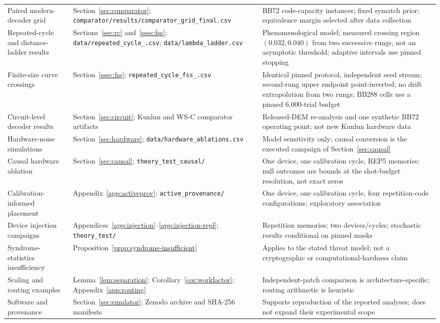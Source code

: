 \documentclass[pdflatex,sn-mathphys-num]{sn-jnl}
\theoremstyle{thmstyleone}
\theoremstyle{thmstyletwo}
\theoremstyle{thmstylethree}
\begin{document}
\begin{longtable}{@{}>{\raggedright\arraybackslash}p{3.4cm}>{\raggedright\arraybackslash}p{4.0cm}>{\raggedright\arraybackslash}p{4.3cm}@{}}
Paired modern-decoder grid & Section~\ref{sec:comparator}; \texttt{comparator/\allowbreak results/\allowbreak comparator\_\allowbreak grid\_\allowbreak final.csv} & BB72 code-capacity instances; fixed symatch prior; equivalence margin selected after data collection \\
Repeated-cycle and distance-ladder results & Sections~\ref{sec:rc} and~\ref{ssec:fss}; \texttt{data/\allowbreak repeated\_\allowbreak cycle\_\allowbreak *.csv}; \texttt{data/\allowbreak lambda\_\allowbreak ladder.csv} & Phenomenological model; measured crossing region $(0.032,0.040)$ from two successive rungs, not an asymptotic threshold; adaptive intervals use pinned stopping \\
Finite-size curve crossings & Section~\ref{ssec:fss}; \texttt{repeated\_\allowbreak cycle\_\allowbreak fss\_\allowbreak *.csv} & Identical pinned protocol, independent seed stream; second-rung upper endpoint point-inverted; no drift extrapolation from two rungs; BB288 cells use a pinned 6{,}000-trial budget \\
Circuit-level decoder results & Section~\ref{sec:circuit}; Kunlun and WS-C comparator artifacts & Released-DEM re-analysis and one synthetic BB72 operating point; not new Kunlun hardware data \\
Hardware-noise simulations & Section~\ref{sec:hardware}; \texttt{data/\allowbreak hardware\_\allowbreak ablations.csv} & Model sensitivity only; causal conversion is the executed campaign of Section~\ref{sec:causal} \\
Causal hardware ablation & Section~\ref{sec:causal}; \texttt{theory\_\allowbreak test\_\allowbreak causal/} & One device, one calibration cycle, REP5 memories; null outcomes are bounds at the shot-budget resolution, not exact zeros \\
Calibration-informed placement & Appendix~\ref{app:activeprov}; \texttt{active\_\allowbreak provenance/} & One device, one calibration cycle, four repetition-code configurations; exploratory association \\
Device injection campaigns & Appendices~\ref{app:injection}--\ref{app:injection-repl}; \texttt{theory\_\allowbreak test/} & Repetition memories; two devices/cycles; stochastic results conditional on pinned masks \\
Syndrome-statistics insufficiency & Proposition~\ref{prop:syndrome-insufficient} & Applies to the stated threat model; not a cryptographic or computational-hardness claim \\
Scaling and routing examples & Lemma~\ref{lem:separation}; Corollary~\ref{cor:workfactor}; Appendix~\ref{app:routing} & Independent-patch comparison is architecture-specific; routing arithmetic is heuristic \\
Software and provenance & Section~\ref{sec:emulator}; Zenodo archive and SHA-256 manifests & Supports reproduction of the reported analyses; does not expand their experimental scope \\
\end{longtable}
\endgroup
\end{document}
